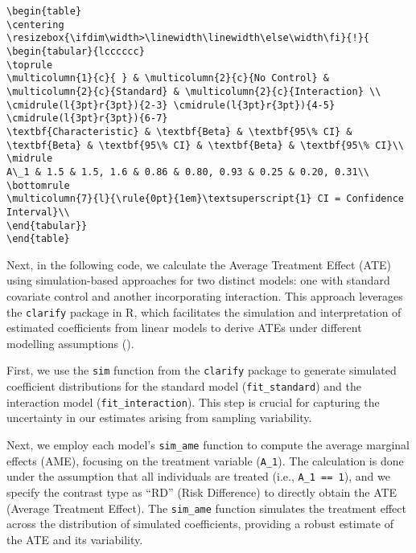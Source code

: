 \documentclass[
  singlecolumn]{article}
\begin{document}
\begin{verbatim}
\begin{table}
\centering
\resizebox{\ifdim\width>\linewidth\linewidth\else\width\fi}{!}{
\begin{tabular}{lcccccc}
\toprule
\multicolumn{1}{c}{ } & \multicolumn{2}{c}{No Control} & \multicolumn{2}{c}{Standard} & \multicolumn{2}{c}{Interaction} \\
\cmidrule(l{3pt}r{3pt}){2-3} \cmidrule(l{3pt}r{3pt}){4-5} \cmidrule(l{3pt}r{3pt}){6-7}
\textbf{Characteristic} & \textbf{Beta} & \textbf{95\% CI} & \textbf{Beta} & \textbf{95\% CI} & \textbf{Beta} & \textbf{95\% CI}\\
\midrule
A\_1 & 1.5 & 1.5, 1.6 & 0.86 & 0.80, 0.93 & 0.25 & 0.20, 0.31\\
\bottomrule
\multicolumn{7}{l}{\rule{0pt}{1em}\textsuperscript{1} CI = Confidence Interval}\\
\end{tabular}}
\end{table}
\end{verbatim}

Next, in the following code, we calculate the Average Treatment Effect
(ATE) using simulation-based approaches for two distinct models: one
with standard covariate control and another incorporating interaction.
This approach leverages the \texttt{clarify} package in R, which
facilitates the simulation and interpretation of estimated coefficients
from linear models to derive ATEs under different modelling assumptions
().

First, we use the \texttt{sim} function from the \texttt{clarify}
package to generate simulated coefficient distributions for the standard
model (\texttt{fit\_standard}) and the interaction model
(\texttt{fit\_interaction}). This step is crucial for capturing the
uncertainty in our estimates arising from sampling variability.

Next, we employ each model's \texttt{sim\_ame} function to compute the
average marginal effects (AME), focusing on the treatment variable
(\texttt{A\_1}). The calculation is done under the assumption that all
individuals are treated (i.e., \texttt{A\_1\ ==\ 1}), and we specify the
contrast type as ``RD'' (Risk Difference) to directly obtain the ATE
(Average Treatment Effect). The \texttt{sim\_ame} function simulates the
treatment effect across the distribution of simulated coefficients,
providing a robust estimate of the ATE and its variability.
\end{document}
